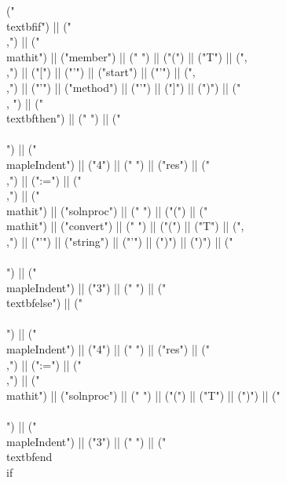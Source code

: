 \documentclass{article}
\begin{document}
\begin{center}
\begin{maplelatex}
{("\\textbf{if}") || (" \\,") || ("\\mathit{") || ("member") || ("} ") || ("(") || ("T") || (",\\,") || ("[") || ("'") || ("start") || ("'") || (",\\,") || ("'") || ("method") || ("'") || ("]") || (")") || (" \\, ") || ("\\textbf{then}") || (" ") || ("\\\\\n") || ("\\mapleIndent{") || ("4") || ("} ") || ("res") || ("\\,") || (":=") || ("\\,") || ("\\mathit{") || ("solnproc") || ("} ") || ("(") || ("\\mathit{") || ("convert") || ("} ") || ("(") || ("T") || (",\\,") || ("'") || ("string") || ("'") || (")") || (")") || ("\\\\\n") || ("\\mapleIndent{") || ("3") || ("} ") || ("\\textbf{else}") || ("\\\\\n") || ("\\mapleIndent{") || ("4") || ("} ") || ("res") || ("\\,") || (":=") || ("\\,") || ("\\mathit{") || ("solnproc") || ("} ") || ("(") || ("T") || (")") || ("\\\\\n") || ("\\mapleIndent{") || ("3") || ("} ") || ("\\textbf{end\\ if}}
\end{maplelatex}
\end{center}
\end{document}
